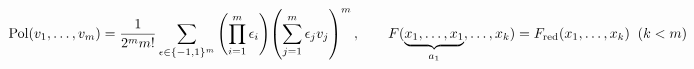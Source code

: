 \documentclass[preview]{standalone}
\begin{document}
\begin{align*}
\special{dvisvgm:raw <g id='unique000'>}\operatorname{Pol}(v_1,\dots,v_m) = \frac{1}{2^m m!}\sum_{\epsilon\in\{-1,1\}^m} \left(\prod_{i=1}^m\epsilon_i\right)\!\left(\sum_{j=1}^m\epsilon_j v_j\right)^m, \qquad F(\underbrace{x_1,\dots,x_1}_{a_1},\dots,x_k) = F_{\text{red}}(x_1,\dots,x_k)\;\;(k<m)\special{dvisvgm:raw </g>}
\end{align*}
\end{document}
